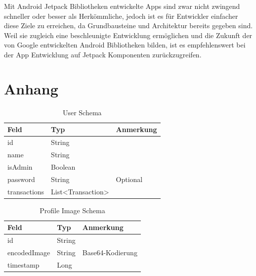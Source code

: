 \documentclass[a4paper, 11pt]{article}
\begin{document}
Mit Android Jetpack Bibliotheken entwickelte Apps sind zwar nicht zwingend schneller oder besser als Herkömmliche, jedoch ist es für Entwickler einfacher diese Ziele zu erreichen, da Grundbausteine und Architektur bereits gegeben sind.
Weil sie zugleich eine beschleunigte Entwicklung ermöglichen und die Zukunft der von Google entwickelten Android Bibliotheken bilden, ist es empfehlenswert bei der App Entwicklung auf Jetpack Komponenten zurückzugreifen.

\newpage
\begingroup
\raggedright
\printbibliography[title={Referenzen}, keyword=citations]
\nocite{*}
\newrefcontext[sorting=nty]
\printbibliography[title={Dokumentation}, keyword=sources, env=sources]
\endgroup

\newpage
\section{Anhang}
\label{sec:attachements}
\begin{table}[H]
	\centering
	\begin{tabular}{@{}lll@{}}
		Feld         & Typ                                      & Anmerkung \\ \toprule
		id           & String                                   &           \\ \midrule
		name         & String                                   &           \\ \midrule
		isAdmin      & Boolean                                  &           \\ \midrule
		password     & String                                   & Optional  \\ \midrule
		transactions & List\textless{}Transaction\textgreater{} &           \\ \bottomrule
	\end{tabular}
	\caption{User Schema}
	\label{tab:attachements:user}
\end{table}

\begin{table}[H]
	\centering
	\begin{tabular}{@{}lll@{}}
		Feld         & Typ    & Anmerkung        \\ \toprule
		id           & String &                  \\ \midrule
		encodedImage & String & Base64-Kodierung \\ \midrule
		timestamp    & Long   &                  \\ \bottomrule
	\end{tabular}
	\caption{Profile Image Schema}
	\label{tab:attachements:profileimage}
\end{table}
\end{document}
